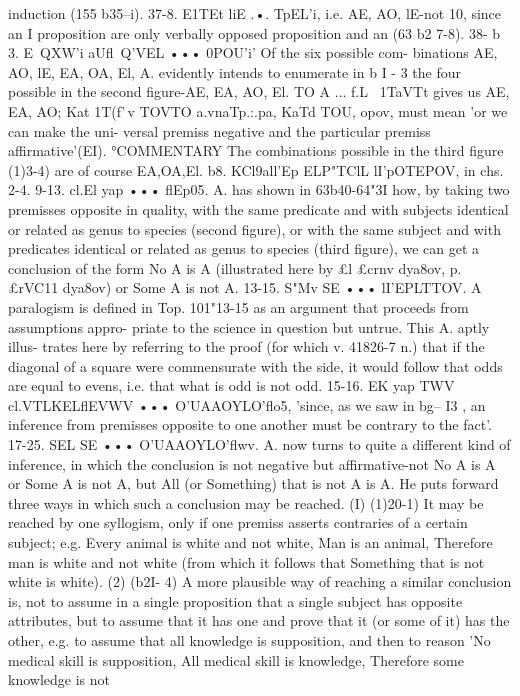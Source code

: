 induction (155 b35--{i).
37-8. E1TEt liE .•. TpEL'i, i.e. AE, AO, lE-not 10, since an I
proposition are only verbally opposed
proposition and an
(63 b2 7-8).
38- b 3. E~QXW'i aUfl~Q'VEL ••• 0POU'i' Of the six possible com-
binations AE, AO, lE, EA, OA, El, A. evidently intends to
enumerate in b I - 3 the four possible in the second figure-AE, EA,
AO, El. TO A ... f.L~ 1TaVTt gives us AE, EA, AO; Kat 1T(f'\,v TOVTO
a.vnaTp.:.pa, KaTd TOU, opov, must mean 'or we can make the uni-
versal premiss negative and the particular premiss affirmative'(EI).
°COMMENTARY
The combinations possible in the third figure (1)3-4) are of course
EA,OA,El.
b8. KCl9all'Ep ELP"TClL lI'pOTEPOV, in chs. 2-4.
9-13. cl.El yap ••• flEp05. A. has shown in 63b40-64"3I how, by
taking two premisses opposite in quality, with the same predicate
and with subjects identical or related as genus to species (second
figure), or with the same subject and with predicates identical or
related as genus to species (third figure), we can get a conclusion
of the form No A is A (illustrated here by £l £crnv dya8ov, p.~ £rVC11
dya8ov) or Some A is not A.
13-15. S"Mv SE ••• lI'EPLTTOV. A paralogism is defined in Top.
101"13-15 as an argument that proceeds from assumptions appro-
priate to the science in question but untrue. This A. aptly illus-
trates here by referring to the proof (for which v. 41826-7 n.) that
if the diagonal of a square were commensurate with the side, it
would follow that odds are equal to evens, i.e. that what is odd is
not odd.
15-16. EK yap TWV cl.VTLKELflEVWV ••• O'UAAOYLO'flo5, 'since, as we
saw in bg-- I3 , an inference from premisses opposite to one another
must be contrary to the fact'.
17-25. SEL SE ••• O'UAAOYLO'flwv. A. now turns to quite a
different kind of inference, in which the conclusion is not negative
but affirmative-not No A is A or Some A is not A, but All (or
Something) that is not A is A. He puts forward three ways in
which such a conclusion may be reached. (I) (1)20-1) It may be
reached by one syllogism, only if one premiss asserts contraries of
a certain subject; e.g. Every animal is white and not white, Man
is an animal, Therefore man is white and not white (from which
it follows that Something that is not white is white). (2) (b2I- 4)
A more plausible way of reaching a similar conclusion is, not to
assume in a single proposition that a single subject has opposite
attributes, but to assume that it has one and prove that it (or
some of it) has the other, e.g. to assume that all knowledge is
supposition, and then to reason 'No medical skill is supposition,
All medical skill is knowledge, Therefore some knowledge is not
}
